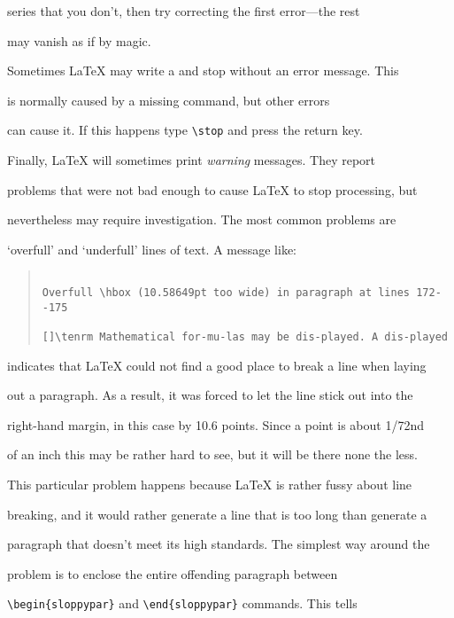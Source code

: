 series that you don't, then try correcting the first error---the rest

may vanish as if by magic.



Sometimes \LaTeX{} may write a {\tt *} and stop without an error message.  This

is normally caused by a missing \verb|| command, but other errors

can cause it.  If this happens type \verb|\stop| and press the return key.



Finally, \LaTeX{} will sometimes print {\em warning\/} messages.  They report

problems that were not bad enough to cause \LaTeX{} to stop processing, but

nevertheless may require investigation.  The most common problems are

`overfull' and `underfull' lines of text.  A message like:

\begin{quote}\footnotesize\begin{verbatim}

Overfull \hbox (10.58649pt too wide) in paragraph at lines 172--175

[]\tenrm Mathematical for-mu-las may be dis-played. A dis-played

\end{verbatim}\end{quote}

indicates that \LaTeX{} could not find a good place to break a line when laying

out a paragraph.  As a result, it was forced to let the line stick out into the

right-hand margin, in this case by 10.6 points.  Since a point is about 1/72nd

of an inch this may be rather hard to see, but it will be there none the less.



This particular problem happens because \LaTeX{} is rather fussy about line

breaking, and it would rather generate a line that is too long than generate a

paragraph that doesn't meet its high standards.  The simplest way around the

problem is to enclose the entire offending paragraph between

\verb|\begin{sloppypar}| and \verb|\end{sloppypar}| commands.  This tells

